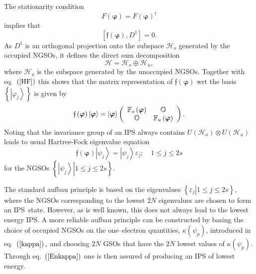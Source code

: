 \documentclass[aps,preprint]{revtex4}%
\begin{document}
The stationarity condition
\begin{equation}
F\left(  \boldsymbol{\varphi}\right)  =F\left(  \boldsymbol{\varphi}\right)
^{\dagger}%
\end{equation}
implies that
\begin{equation}
\left[  \mathfrak{f}\left(  \boldsymbol{\varphi}\right)  ,D^{1}\right]  =0.
\label{HF}%
\end{equation}
As $D^{1}$ is an orthogonal projection onto the subspace $\mathcal{H}_{o}$
generated by the occupied NGSOs, it defines the direct sum decomposition
\begin{equation}
\mathcal{H=H}_{o}\oplus\mathcal{H}_{u}, \label{DS}%
\end{equation}
where $\mathcal{H}_{u}$ is the subspace generated by the unoccupied NGSOs.
Together with eq.\ $\left(  \ref{HF}\right)  $ this shows that the matrix
representation of $\mathfrak{f}\left(  \boldsymbol{\varphi}\right)  $ wrt the
basis $\left\{  \left\vert \varphi_{j}\right\rangle \right\}  $ is given by
\begin{equation}
\mathfrak{f}\left(  \boldsymbol{\varphi}\right)  \left\vert
\boldsymbol{\varphi}\right\rangle =\left\vert \boldsymbol{\varphi
}\right\rangle \left(
\begin{array}
[c]{cc}%
\mathbb{F}_{o}\left(  \boldsymbol{\varphi}\right)  & \mathbb{O}\\
\mathbb{O} & \mathbb{F}_{u}\left(  \boldsymbol{\varphi}\right)
\end{array}
\right)  .
\end{equation}
Noting that the invariance group of an IPS always contains $U\left(
\mathcal{H}_{o}\right)  \otimes U\left(  \mathcal{H}_{u}\right)  $ leads to
usual Hartree-Fock eigenvalue equation
\begin{equation}
\mathfrak{f}\left(  \boldsymbol{\varphi}\right)  \left\vert \psi
_{j}\right\rangle =\left\vert \psi_{j}\right\rangle \varepsilon_{j};\quad1\leq
j\leq2s
\end{equation}
for the NGSOs $\left\{  \left.  \left\vert \psi_{j}\right\rangle \right\vert
1\leq j\leq2s\right\}  $.

The standard aufbau principle is based on the eigenvalues $\left\{  \left.
\varepsilon_{j}\right\vert 1\leq j\leq2s\right\}  ,$ where the NGSOs
corresponding to the lowest $2N$ eigenvalues are chosen to form an IPS\ state.
However, as is well known, this does not always lead to the lowest energy IPS.
A more reliable aufbau principle can be constructed by basing the choice of
occupied NGSOs on the one--electron quantities, $\kappa\left(  \psi
_{p}\right)  $, introduced in eq.\ $\left(  \ref{kappa}\right)  ,$ and
choosing $2N$ GSOs that have the $2N$ lowest values of $\kappa\left(  \psi
_{p}\right)  $. Through eq.\ $\left(  \ref{Enkappa}\right)  $ one is then
assured of producing an IPS of lowest energy.
\end{document}
